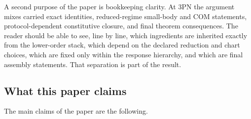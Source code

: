 \documentclass[11pt]{article}
\begin{document}
A second purpose of the paper is bookkeeping clarity.  At $3$PN the argument
mixes carried exact identities, reduced-regime small-body and COM statements,
protocol-dependent constitutive closure, and final theorem consequences.  The
reader should be able to see, line by line, which ingredients are inherited
exactly from the lower-order stack, which depend on the declared reduction and
chart choices, which are fixed only within the response hierarchy, and which are
final assembly statements.  That separation is part of the result.

\subsection{What this paper claims}
\label{sec:intro-claims}

The main claims of the paper are the following.
\end{document}
